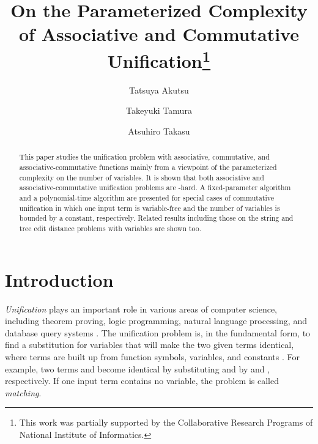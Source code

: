 \documentclass[a4paper]{llncs}
\begin{document}
\title{On the Parameterized Complexity of Associative and Commutative Unification\thanks{
This work was partially supported by the Collaborative Research Programs
of National Institute of Informatics.}}
\titlerunning{}

\author{Tatsuya Akutsu
\and Takeyuki Tamura
\and 
Atsuhiro Takasu}


\maketitle

\begin{abstract}
This paper studies the unification problem with
associative, commutative, and associative-commutative functions mainly
from a viewpoint of the parameterized complexity on the number of
variables.
It is shown that
both associative and associative-commutative unification problems
are -hard.
A fixed-parameter algorithm and a polynomial-time algorithm are presented for
special cases of commutative unification in which
one input term is variable-free and the number of variables is bounded by 
a constant, respectively.
Related results including those on
the string and tree edit distance problems with variables are shown too.
\end{abstract}

\section{Introduction}

\emph{Unification} plays an important role in various areas of computer science,
including theorem proving, logic programming, natural language processing,
and database query systems \cite{kapur92,knight89}.
The unification problem is, in the fundamental form,
to find a substitution for variables that will make the two given
terms identical, where terms are built up from function symbols, 
variables, and constants \cite{knight89}.
For example, two terms  and  become identical
by substituting  and  by  and , respectively.
If one input term contains no variable, the problem is called \emph{matching}.
\end{document}
